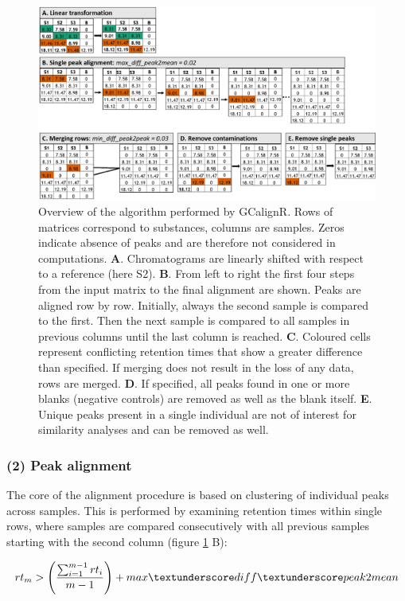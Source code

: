 \begin{figure}[htbp]
\centering
\includegraphics[width=13cm]{figures/algorithm}
\caption{Overview of the algorithm performed by GCalignR. Rows of matrices correspond to substances, columns are samples. Zeros indicate absence of peaks and are therefore not considered in computations. \textbf{A}. Chromatograms are linearly shifted with respect to a reference (here S2). \textbf{B}. From left to right the first four steps from the input matrix to the final alignment are shown. Peaks are aligned row by row. Initially, always the second sample is compared to the first. Then the next sample is compared to all samples in previous columns until the last column is reached. \textbf{C}. Coloured cells represent conflicting retention times that show a greater difference than specified. If merging does not result in the loss of any data, rows are merged. \textbf{D}. If specified, all peaks found in one or more blanks (negative controls) are removed as well as the blank itself. \textbf{E}. Unique peaks present in a single individual are not of interest for similarity analyses and can be removed as well.}
\label{figure:algorithm}
\end{figure}

\subsubsection{(2) Peak alignment}\label{peak-alignment}

The core of the alignment procedure is based on clustering of individual
peaks across samples. This is performed by examining retention times
within single rows, where samples are compared consecutively with all
previous samples starting with the second column (figure
\ref{figure:algorithm} B):

\begin{equation}
rt_{m} > \left(\frac{\sum_{i=1}^{m-1}rt_{i}}{m-1}\right) + max\textunderscore diff\textunderscore peak2mean
\end{equation}

